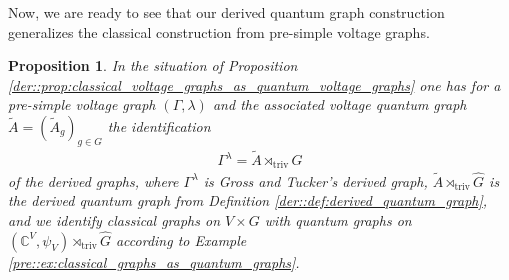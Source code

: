 \documentclass{amsart}
\newcommand{\C}{\mathbb{C}}
\newtheorem{proposition}[thm]{Proposition}
\theoremstyle{definition}
\theoremstyle{definition}
\begin{document}
Now, we are ready to see that our derived quantum graph construction generalizes the classical construction from pre-simple voltage graphs.

\begin{proposition}
    In the situation of Proposition \ref{der::prop:classical_voltage_graphs_as_quantum_voltage_graphs} one has for a pre-simple voltage graph $(\Gamma, \lambda)$ and the associated voltage quantum graph $\tilde{A} = (\tilde{A}_g)_{g \in G}$ the identification
    \begin{align*}
        \Gamma^\lambda = \tilde{A} \rtimes_{\mathrm{triv}} \hat{G}
    \end{align*}
    of the derived graphs, where $\Gamma^\lambda$ is Gross and Tucker's derived graph, $\tilde{A} \rtimes_{\mathrm{triv}} \hat{G}$ is the derived quantum graph from Definition \ref{der::def:derived_quantum_graph}, and we identify classical graphs on $V \times G$ with quantum graphs on $(\C^V, \psi_V) \rtimes_{\mathrm{triv}} \hat{G}$ according to Example \ref{pre::ex:classical_graphs_as_quantum_graphs}.
\end{proposition}
\end{document}
